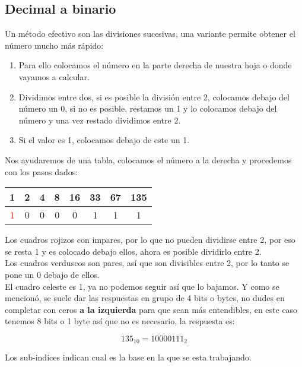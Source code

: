 \documentclass[
	12pt, %
	fleqn, %
	a4paper, %
]{LegrandOrangeBook}
\begin{document}
\subsection{Decimal a binario}
Un método efectivo son las divisiones sucesivas, una variante permite obtener el número mucho más rápido:
\begin{enumerate}
\item Para ello colocamos el número en la parte derecha de nuestra hoja o donde vayamos a calcular.
\item Dividimos entre dos, si es posible la división entre 2, colocamos debajo del número un 0, si no es posible, restamos un 1 y lo colocamos debajo del número y una vez restado dividimos entre 2.
\item Si el valor es 1, colocamos debajo de este un 1.
\end{enumerate}
\begin{example}
Nos ayudaremos de una tabla, colocamos el número a la derecha y procedemos con los pasos dados:
\begin{center}
\begin{tabular}{|c|c|c|c|c|c|c|c|}
\hline
\rowcolor[HTML]{9AFF99} 
\cellcolor[HTML]{96FFFB}1 & 2 & 4 & 8 & 16 & \cellcolor[HTML]{FFCCC9}33 & \cellcolor[HTML]{FFCCC9}67 & \cellcolor[HTML]{FFCCC9}135 \\ \hline
\textcolor{red}{1}        & 0 & 0 & 0 & 0  & 1                          & 1                          & 1                           \\ \hline
\end{tabular}
\end{center}
Los cuadros rojizos con impares, por lo que no pueden dividirse entre 2, por eso se resta 1 y es colocado debajo ellos, ahora es posible dividirlo entre 2.\\
Los cuadros verduscos son pares, así que son divisibles entre 2, por lo tanto se pone un 0 debajo de ellos.\\
El cuadro celeste es 1, ya no podemos seguir así que lo bajamos. Y como se mencionó, se suele dar las respuestas en grupo de 4 bits o bytes, no dudes en completar con ceros \textbf{a la izquierda} para que sean más entendibles, en este caso tenemos 8 bits o 1 byte así que no es necesario, la respuesta es:
\begin{center}
\begin{displaymath}
135_{10}=1000 0111_2
\end{displaymath}
\end{center}
\end{example}
\begin{remark}
Los sub-indices indican cual es la base en la que se esta trabajando.
\end{remark}
\end{document}
